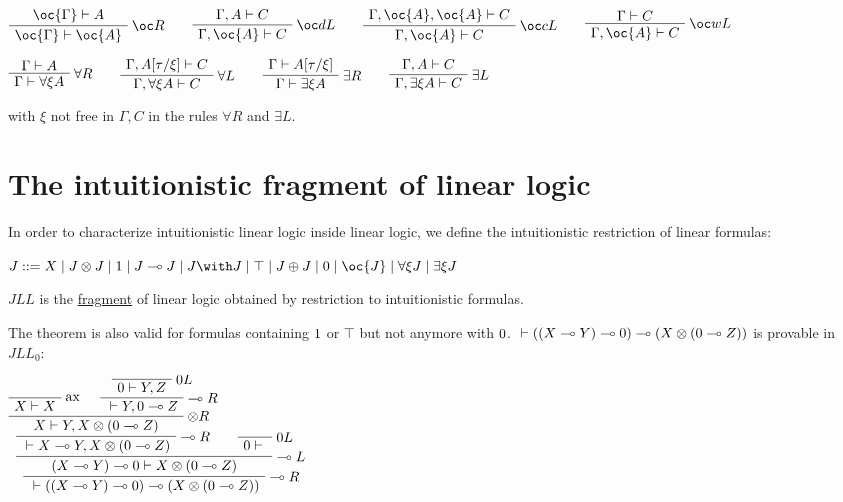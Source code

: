 \(\AxRule{\oc{\Gamma}\vdash A}
\LabelRule{\oc R}
\UnaRule{\oc{\Gamma}\vdash\oc{A}}
\DisplayProof
\qquad
\AxRule{\Gamma,A\vdash C}
\LabelRule{\oc d L}
\UnaRule{\Gamma,\oc{A}\vdash C}
\DisplayProof
\qquad
\AxRule{\Gamma,\oc{A},\oc{A}\vdash C}
\LabelRule{\oc c L}
\UnaRule{\Gamma,\oc{A}\vdash C}
\DisplayProof
\qquad
\AxRule{\Gamma\vdash C}
\LabelRule{\oc w L}
\UnaRule{\Gamma,\oc{A}\vdash C}
\DisplayProof\)

\(\AxRule{\Gamma\vdash A}
\LabelRule{\forall R}
\UnaRule{\Gamma\vdash \forall\xi A}
\DisplayProof
\qquad
\AxRule{\Gamma,A[\tau/\xi]\vdash C}
\LabelRule{\forall L}
\UnaRule{\Gamma,\forall\xi A\vdash C}
\DisplayProof
\qquad
\AxRule{\Gamma\vdash A[\tau/\xi]}
\LabelRule{\exists R}
\UnaRule{\Gamma\vdash\exists\xi A}
\DisplayProof
\qquad
\AxRule{\Gamma,A\vdash C}
\LabelRule{\exists L}
\UnaRule{\Gamma,\exists\xi A\vdash C}
\DisplayProof\)

with \(\xi\) not free in \(\Gamma,C\) in the rules \(\forall R\) and
\(\exists L\).

\section{The intuitionistic fragment of linear logic}\label{the-intuitionistic-fragment-of-linear-logic}

In order to characterize intuitionistic linear logic inside linear
logic, we define the intuitionistic restriction of linear formulas:

\(J ::= X \mid J\tens J \mid \one \mid J\limp J \mid J\with J \mid \top \mid J\plus J \mid \zero \mid \oc{J} \mid \forall\xi J \mid \exists\xi J\)

\(JLL\) is the \url{fragment} of linear logic obtained by restriction to
intuitionistic formulas.

The theorem is also valid for formulas containing \(1\) or \(\top\)
but not anymore with \(0\).
\({}\vdash((X\multimap Y)\multimap0)\multimap(X\otimes(0\multimap Z))\) is
provable in \(JLL_0\):

\(\LabelRule{\rulename{ax}}
\NulRule{X\vdash X}
\LabelRule{\zero L}
\NulRule{\zero\vdash Y,Z}
\LabelRule{\limp R}
\UnaRule{{}\vdash Y,\zero\limp Z}
\LabelRule{\tens R}
\BinRule{X\vdash Y,X\tens(\zero\limp Z)}
\LabelRule{\limp R}
\UnaRule{{}\vdash X\limp Y,X\tens(\zero\limp Z)}
\LabelRule{\zero L}
\NulRule{\zero\vdash {}}
\LabelRule{\limp L}
\BinRule{(X\limp Y)\limp\zero\vdash X\tens(\zero\limp Z)}
\LabelRule{\limp R}
\UnaRule{{}\vdash((X\limp Y)\limp\zero)\limp(X\tens(\zero\limp Z))}
\DisplayProof\)

